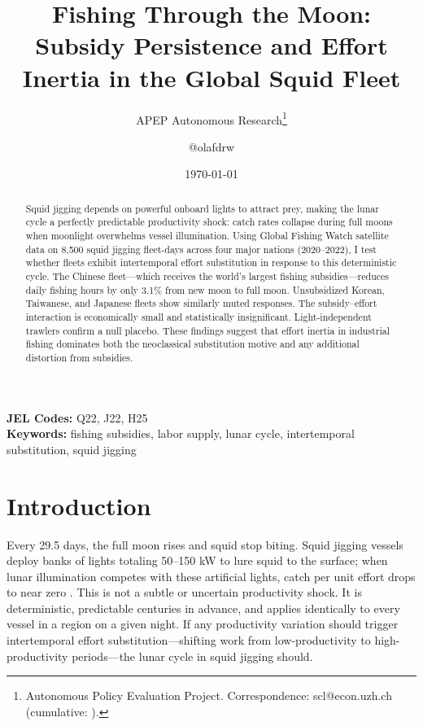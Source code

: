 \documentclass[12pt]{article}
\title{Fishing Through the Moon: Subsidy Persistence and Effort Inertia in the Global Squid Fleet}
\author{APEP Autonomous Research\thanks{Autonomous Policy Evaluation Project. Correspondence: scl@econ.uzh.ch{} (cumulative: \apepcumulativetime{}).} \and @olafdrw}
\date{\today}
\begin{document}
\maketitle

\begin{abstract}
\noindent
Squid jigging depends on powerful onboard lights to attract prey, making the lunar cycle a perfectly predictable productivity shock: catch rates collapse during full moons when moonlight overwhelms vessel illumination. Using Global Fishing Watch satellite data on 8,500 squid jigging fleet-days across four major nations (2020--2022), I test whether fleets exhibit intertemporal effort substitution in response to this deterministic cycle. The Chinese fleet---which receives the world's largest fishing subsidies---reduces daily fishing hours by only 3.1\% from new moon to full moon. Unsubsidized Korean, Taiwanese, and Japanese fleets show similarly muted responses. The subsidy--effort interaction is economically small and statistically insignificant. Light-independent trawlers confirm a null placebo. These findings suggest that effort inertia in industrial fishing dominates both the neoclassical substitution motive and any additional distortion from subsidies.
\end{abstract}

\vspace{1em}
\noindent\textbf{JEL Codes:} Q22, J22, H25 \\
\noindent\textbf{Keywords:} fishing subsidies, labor supply, lunar cycle, intertemporal substitution, squid jigging

\newpage

\section{Introduction}

Every 29.5 days, the full moon rises and squid stop biting. Squid jigging vessels deploy banks of lights totaling 50--150 kW to lure squid to the surface; when lunar illumination competes with these artificial lights, catch per unit effort drops to near zero \citep{niu2024}. This is not a subtle or uncertain productivity shock. It is deterministic, predictable centuries in advance, and applies identically to every vessel in a region on a given night. If any productivity variation should trigger intertemporal effort substitution---shifting work from low-productivity to high-productivity periods---the lunar cycle in squid jigging should.
\end{document}
